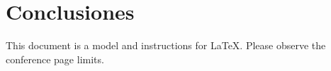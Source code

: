 \section{Conclusiones}

This document is a model and instructions for \LaTeX.
Please observe the conference page limits. 